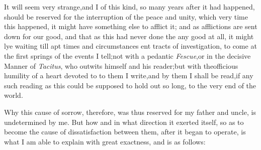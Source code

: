 \documentclass[twoside]{article}
\begin{document}
It will seem very strange,\tsh and I\break 
{}
of this kind, so many years after it had happened,
should be reserved for the interruption of the peace and unity,
which 
very time this happened, it might have 
something else to afflict it; and as afflictions
are sent down for our good, and that as this
had never done the 
any good at all, it might lye\break
waiting till apt times and circumstances 
ent tracts of investigation, to come at
the first springs of the events I tell;\tsk\break not with a pedantic
\textit{Fescue},\tsk or in the decisive Manner of \textit{Tacitus},
who outwits himself and his reader;\tsk but with the\break officious
humility of a heart devoted to 
to them I write,\tsh and by them I
shall be read,\tsh if any such reading as this could be
supposed to hold out so long,\break
to the very end of the
world.\\\eject

Why this cause of sorrow, therefore, was thus reserved for my
father and uncle, is undetermined by me. But how and in what
direction it exerted itself, so as to become the cause of
dissatisfaction between them, after it began to operate, is what I
am able to explain with great exactness, and is as follows:
\end{document}
